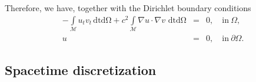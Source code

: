 \documentclass[nofootinbib,preprintnumbers,superscriptaddress,notitlepage]{revtex4-1}
\newcommand{\<}{\begin{equation}}
\newcommand{\?}{\end{equation}}
\begin{document}
Therefore, we have, together with the Dirichlet boundary conditions
\begin{eqnarray}
\label{eq:variationalform}
- \int\limits_{\mathcal{M}} u_t v_t \mathrm{\,dtd\Omega}
+ c^2\int\limits_{\mathcal{M}} \nabla u \cdot \nabla v \,\mathrm{\,dt d\Omega}
&=& 0, \quad \text{in}~\Omega,\\
u &=& 0, \quad \text{in}~\partial\Omega. 
\end{eqnarray}

\subsection{Spacetime discretization}
\end{document}
